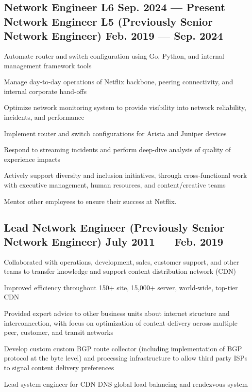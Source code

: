 \documentclass[letter,10pt]{article}
\begin{document}
\subsection{Network Engineer L6 \hfill \textrm{\textmd{Sep. 2024 --- Present}}\\
	Network Engineer L5 (Previously Senior Network Engineer) \hfill \textrm{\textmd{Feb. 2019 --- Sep. 2024}}}
\begin{zitemize}
	\item Automate router and switch configuration using Go, Python, and
	internal management framework tools
	\item Manage day-to-day operations of Netflix backbone, peering
	connectivity, and internal corporate hand-offs
	\item Optimize network monitoring system to provide visibility
	into network reliability, incidents, and performance
	\item Implement router and switch configurations for Arista and
	Juniper devices
	\item Respond to streaming incidents and perform deep-dive
	analysis of quality of experience impacts
	\item Actively support diversity and inclusion initiatives,
	through cross-functional work with executive management,
	human resources, and content/creative teams
	\item Mentor other employees to ensure their success at Netflix.
\end{zitemize}


\subsection{Lead Network Engineer (Previously Senior Network Engineer) \hfill \textrm{\textmd{July 2011 --- Feb. 2019}}}
\begin{zitemize}
	\item Collaborated with operations, development, sales, customer support,
	and other teams to transfer knowledge and support content
	distribution network (CDN)
	\item Improved efficiency throughout 150+ site, 15,000+ server,
	world-wide, top-tier CDN
	\item Provided expert advice to other business units about internet
	structure and interconnection, with focus on optimization of content delivery across
	multiple peer, customer, and transit networks
	\item Develop custom custom BGP route collector (including
	implementation of BGP protocol at the byte level) and processing infrastructure
	to allow third party ISPs to signal content delivery preferences
	\item Lead system engineer for CDN DNS global load balancing and
	rendezvous system
\end{zitemize}
\end{document}
